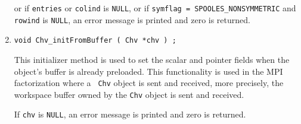 \begin{enumerate}
or if {\tt entries} or {\tt colind} is {\tt NULL},
or if {\tt symflag = SPOOLES\_NONSYMMETRIC} 
and {\tt rowind} is {\tt NULL},
an error message is printed and zero is returned.
\item
\begin{verbatim}
void Chv_initFromBuffer ( Chv *chv ) ;
\end{verbatim}
This initializer method is used to set the scalar and pointer fields
when the object's buffer is already preloaded.
This functionality is used in the MPI factorization where a {\tt
Chv} object is sent and received, more precisely, the workspace
buffer owned by the {\tt Chv} object is sent and received.
\par {}
If {\tt chv} is {\tt NULL},
an error message is printed and zero is returned.
\end{enumerate}
\par
